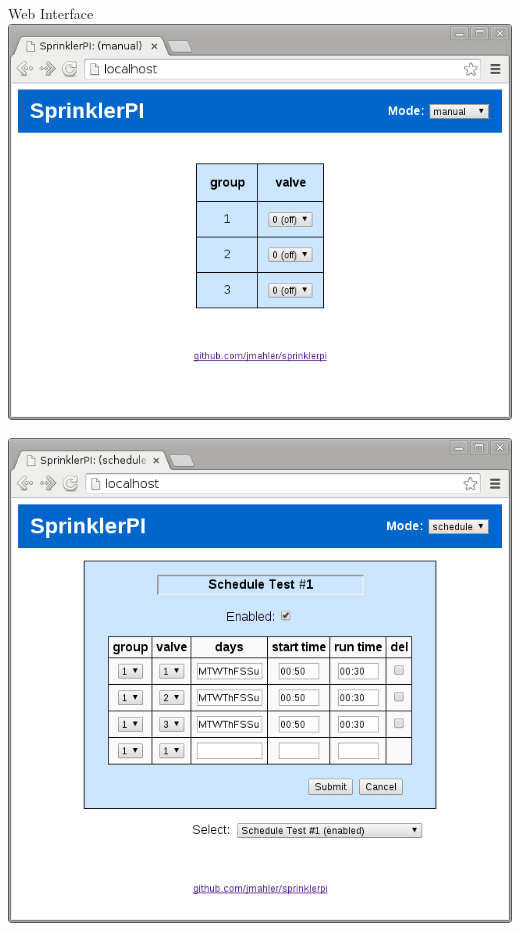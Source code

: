 \documentclass{article}
\begin{document}
\begin{center}

{\fontsize{20}{20}\selectfont Web Interface} \\
\vspace*{0.5in}
\includegraphics[scale=0.50]{../testing/img/www-manual_mode.png}

\vspace{0.3in}

\includegraphics[scale=0.50]{../testing/img/www-schedule_test1.png}

\end{center}
\pagebreak
\end{document}
